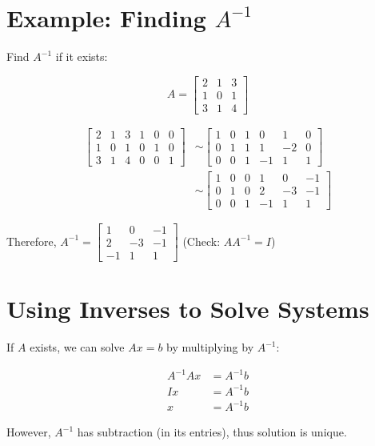 \documentclass[11pt,a4paper]{article}
\begin{document}
\section{Example: Finding $A^{-1}$}

Find $A^{-1}$ if it exists:

\[A = \begin{bmatrix} 2 & 1 & 3 \\ 1 & 0 & 1 \\ 3 & 1 & 4 \end{bmatrix}\]

\begin{align*}
    \begin{bmatrix}
    2 & 1 & 3 & 1 & 0 & 0 \\
    1 & 0 & 1 & 0 & 1 & 0 \\
    3 & 1 & 4 & 0 & 0 & 1
    \end{bmatrix}
    &\sim
    \begin{bmatrix}
    1 & 0 & 1 & 0 & 1 & 0 \\
    0 & 1 & 1 & 1 & -2 & 0 \\
    0 & 0 & 1 & -1 & 1 & 1
    \end{bmatrix} \\
    &\sim
    \begin{bmatrix}
    1 & 0 & 0 & 1 & 0 & -1 \\
    0 & 1 & 0 & 2 & -3 & -1 \\
    0 & 0 & 1 & -1 & 1 & 1
    \end{bmatrix}
\end{align*}

Therefore, $A^{-1} = \begin{bmatrix} 1 & 0 & -1 \\ 2 & -3 & -1 \\ -1 & 1 & 1 \end{bmatrix}$ (Check: $AA^{-1} = I$)

\section{Using Inverses to Solve Systems}

If $A$ exists, we can solve $Ax = b$ by multiplying by $A^{-1}$:

\begin{align*}
    A^{-1}Ax &= A^{-1}b \\
    Ix &= A^{-1}b \\
    x &= A^{-1}b
\end{align*}

However, $A^{-1}$ has subtraction (in its entries), thus solution is unique.
\end{document}
